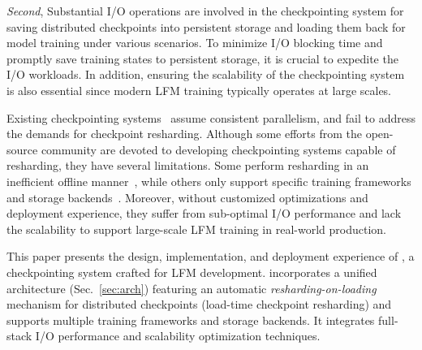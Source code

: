 \textit{Second},
Substantial I/O operations are involved in the checkpointing system for saving distributed checkpoints into persistent storage and loading them back for model training under various scenarios.
To minimize I/O blocking time and promptly save training states to persistent storage, it is crucial to expedite the I/O workloads.
In addition, ensuring the scalability of the checkpointing system is also essential since modern LFM training typically operates at large scales.

Existing checkpointing systems~\cite{checkfreq, check-n-run, gemini-sys, jit-check} assume consistent parallelism, 
and fail to address the demands for checkpoint resharding.
Although some efforts from the open-source community are devoted to developing checkpointing systems capable of resharding, they have several limitations. 
Some perform resharding in an inefficient offline manner~\cite{deepspeed-ucp}, while others only support specific training frameworks and storage backends~\cite{torch-dcp, megatron-dcp}.
Moreover, without customized optimizations and deployment experience, they suffer from sub-optimal I/O performance and lack the scalability to support large-scale LFM training in real-world production.

This paper presents the design, implementation, and deployment experience of \sys{}, a checkpointing system crafted for LFM development.
\sys{} incorporates a unified architecture (Sec.~\ref{sec:arch}) featuring an automatic \textit{resharding-on-loading} mechanism for distributed checkpoints (load-time checkpoint resharding) and supports multiple training frameworks and storage backends.
It integrates full-stack I/O performance and scalability optimization techniques.


